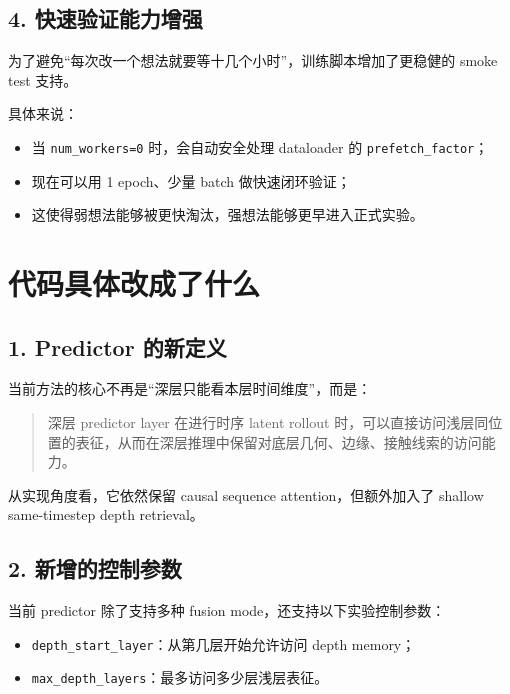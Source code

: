 \documentclass[UTF8,a4paper,11pt]{ctexart}
\begin{document}
\subsection{4. 快速验证能力增强}

为了避免“每次改一个想法就要等十几个小时”，训练脚本增加了更稳健的 smoke test 支持。

具体来说：

\begin{itemize}[leftmargin=2em]
  \item 当 \texttt{num\_workers=0} 时，会自动安全处理 dataloader 的 \texttt{prefetch\_factor}；
  \item 现在可以用 1 epoch、少量 batch 做快速闭环验证；
  \item 这使得弱想法能够被更快淘汰，强想法能够更早进入正式实验。
\end{itemize}

\section{代码具体改成了什么}

\subsection{1. Predictor 的新定义}

当前方法的核心不再是“深层只能看本层时间维度”，而是：

\begin{quote}
深层 predictor layer 在进行时序 latent rollout 时，可以直接访问浅层同位置的表征，从而在深层推理中保留对底层几何、边缘、接触线索的访问能力。
\end{quote}

从实现角度看，它依然保留 causal sequence attention，但额外加入了 shallow same-timestep depth retrieval。

\subsection{2. 新增的控制参数}

当前 predictor 除了支持多种 fusion mode，还支持以下实验控制参数：

\begin{itemize}[leftmargin=2em]
  \item \texttt{depth\_start\_layer}：从第几层开始允许访问 depth memory；
  \item \texttt{max\_depth\_layers}：最多访问多少层浅层表征。
\end{itemize}
\end{document}
